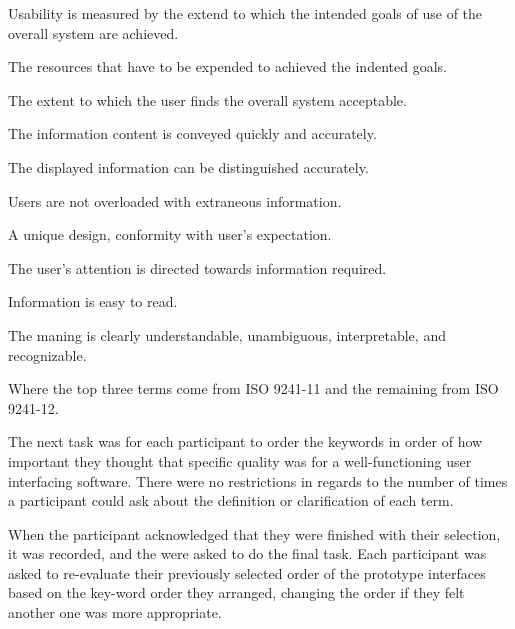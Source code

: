 \documentclass[nofilelist,dvipsnames]{cslthse-msc}
\begin{document}
            \begin{description}[style=nextline]
              \item[Effectiveness]{
                Usability is measured by the extend to which the
                intended goals of use of the overall system are achieved.
              }
              \item[Efficiency]{
                The resources that have to be expended to achieved the indented
                goals.
              }
              \item[Satisfaction]{
                The extent to which the user finds the overall system
                acceptable.
              }
              \item[Clarity]{
                  The information content is conveyed quickly and accurately.
              }
              \item[Discriminability]{
                  The displayed information can be distinguished
                  accurately.
              }
              \item[Conciseness]{
                  Users are not overloaded with extraneous information.
              }
              \item[Consistency]{
                  A unique design, conformity with user's expectation.
              }
              \item[Detectability]{
                  The user's attention is directed towards information
                  required.
              }
              \item[Legibility]{
                  Information is easy to read.
              }
              \item[Comprehensibility]{
                  The maning is clearly understandable, unambiguous,
                  interpretable, and recognizable.
              }
            \end{description}

        Where the top three terms come from ISO 9241-11 and the remaining
        from ISO 9241-12.

        The next task was for each participant to order the keywords
        in order of how important they thought that specific quality was for a
        well-functioning user interfacing software. There were no restrictions
        in regards to the number of times a participant could ask about the
        definition or clarification of each term.

        When the participant acknowledged that they were finished with their
        selection, it was recorded, and the were asked to do the final task.
        Each participant was asked to re-evaluate their previously selected
        order of the prototype interfaces based on the key-word order they
        arranged, changing the order if they felt another one was more
        appropriate.
\end{document}
